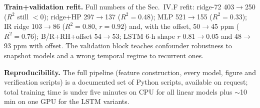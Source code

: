 \documentclass[twocolumn]{revtex4}
\begin{document}
{\bf Train+validation refit.} Full numbers of the Sec.~IV.F refit:
ridge-72 403$\to$250 ($R^2$ still $<0$); ridge+HP 297$\to$137
($R^2=0.48$); MLP 521$\to$155 ($R^2=0.33$); IR ridge 103$\to$86
($R^2=0.80$, $r=0.92$) and, with the offset, 50$\to$45 ppm
($R^2=0.76$); B/R+RH+offset 54$\to$53; LSTM 6-h shape $r$ 0.81$\to$0.05
and 48$\to$93 ppm with offset. The validation block teaches confounder
robustness to snapshot models and a wrong temporal regime to
recurrent ones.

{\bf Reproducibility.} The full pipeline (feature construction, every
model, figure and verification scripts) is a documented set of Python
scripts, available on request; total training time
is under five minutes on CPU for all linear models plus
$\sim$10 min on one GPU for the LSTM variants.
\end{document}
